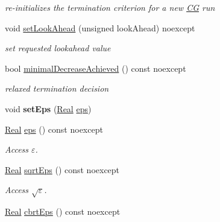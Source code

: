\begin{DoxyCompactItemize}
\begin{DoxyCompactList}\small\item\em re-\/initializes the termination criterion for a new \hyperlink{namespaceSpacy_1_1CG}{\-C\-G} run \end{DoxyCompactList}\item 
void \hyperlink{classSpacy_1_1CG_1_1Termination_1_1StrakosTichyEnergyError_ac40343f544b7e2bfeffa7f7927cfeac5}{set\-Look\-Ahead} (unsigned look\-Ahead) noexcept
\begin{DoxyCompactList}\small\item\em set requested lookahead value \end{DoxyCompactList}\item 
bool \hyperlink{classSpacy_1_1CG_1_1Termination_1_1StrakosTichyEnergyError_af13fec942d9d9ec622803e226537ffec}{minimal\-Decrease\-Achieved} () const noexcept
\begin{DoxyCompactList}\small\item\em relaxed termination decision \end{DoxyCompactList}\item 
\hypertarget{classSpacy_1_1Mixin_1_1Eps_a6b4c38a60848c0ab665fb3a81e181786}{void {\bfseries set\-Eps} (\hyperlink{classSpacy_1_1Real}{\-Real} \hyperlink{classSpacy_1_1Mixin_1_1Eps_a812b99b0abc1d78a34b4114907f23f52}{eps})}\label{classSpacy_1_1Mixin_1_1Eps_a6b4c38a60848c0ab665fb3a81e181786}

\item 
\hypertarget{classSpacy_1_1Mixin_1_1Eps_a812b99b0abc1d78a34b4114907f23f52}{\hyperlink{classSpacy_1_1Real}{\-Real} \hyperlink{classSpacy_1_1Mixin_1_1Eps_a812b99b0abc1d78a34b4114907f23f52}{eps} () const noexcept}\label{classSpacy_1_1Mixin_1_1Eps_a812b99b0abc1d78a34b4114907f23f52}

\begin{DoxyCompactList}\small\item\em \-Access $\varepsilon$. \end{DoxyCompactList}\item 
\hypertarget{classSpacy_1_1Mixin_1_1Eps_abd50a47b32614a950189855775a09d05}{\hyperlink{classSpacy_1_1Real}{\-Real} \hyperlink{classSpacy_1_1Mixin_1_1Eps_abd50a47b32614a950189855775a09d05}{sqrt\-Eps} () const noexcept}\label{classSpacy_1_1Mixin_1_1Eps_abd50a47b32614a950189855775a09d05}

\begin{DoxyCompactList}\small\item\em \-Access $\sqrt\varepsilon$. \end{DoxyCompactList}\item 
\hypertarget{classSpacy_1_1Mixin_1_1Eps_a4bbca3a4afc878d1a20b6335f35e58f7}{\hyperlink{classSpacy_1_1Real}{\-Real} \hyperlink{classSpacy_1_1Mixin_1_1Eps_a4bbca3a4afc878d1a20b6335f35e58f7}{cbrt\-Eps} () const noexcept}\label{classSpacy_1_1Mixin_1_1Eps_a4bbca3a4afc878d1a20b6335f35e58f7}


\end{DoxyCompactItemize}
